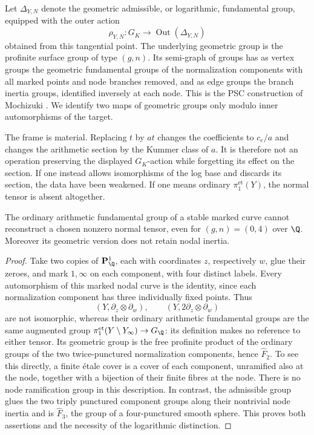 Let $\Delta_{Y,N}$ denote the geometric admissible, or logarithmic, fundamental group, equipped with the outer action
\[
 \rho_{Y,N}:G_K\longrightarrow\operatorname{Out}(\Delta_{Y,N})
\]
obtained from this tangential point. The underlying geometric group is the profinite surface group of type $(g,n)$. Its semi-graph of groups has as vertex groups the geometric fundamental groups of the normalization components with all marked points and node branches removed, and as edge groups the branch inertia groups, identified inversely at each node. This is the PSC construction of Mochizuki \cite[Definition 1.1 and Example 2.5]{Mochizuki2007A567}. We identify two maps of geometric groups only modulo inner automorphisms of the target.

The frame is material. Replacing $t$ by $a t$ changes the coefficients to $c_e/a$ and changes the arithmetic section by the Kummer class of $a$. It is therefore not an operation preserving the displayed $G_K$-action while forgetting its effect on the section. If one instead allows isomorphisms of the log base and discards its section, the data have been weakened. If one means ordinary $\pi_1^{\mathrm{et}}(Y)$, the normal tensor is absent altogether.

\begin{proposition}\label{A6-ordinary-counterexample}
The ordinary arithmetic fundamental group of a stable marked curve cannot reconstruct a chosen nonzero normal tensor, even for $(g,n)=(0,4)$ over $\Q$. Moreover its geometric version does not retain nodal inertia.
\end{proposition}
\begin{proof}
Take two copies of $\mathbf P^1_\Q$, each with coordinates $z$, respectively $w$, glue their zeroes, and mark $1,\infty$ on each component, with four distinct labels. Every automorphism of this marked nodal curve is the identity, since each normalization component has three individually fixed points. Thus
\[
 (Y,\partial_z\otimes\partial_w),\qquad
 (Y,2\partial_z\otimes\partial_w)
\]
are not isomorphic, whereas their ordinary arithmetic fundamental groups are the same augmented group $\pi_1^{\mathrm{et}}(Y\setminus Y_\infty)\to G_\Q$: its definition makes no reference to either tensor. Its geometric group is the free profinite product of the ordinary groups of the two twice-punctured normalization components, hence $\widehat{F}_2$. To see this directly, a finite étale cover is a cover of each component, unramified also at the node, together with a bijection of their finite fibres at the node. There is no node ramification group in this description. In contrast, the admissible group glues the two triply punctured component groups along their nontrivial node inertia and is $\widehat{F}_3$, the group of a four-punctured smooth sphere. This proves both assertions and the necessity of the logarithmic distinction.
\end{proof}

